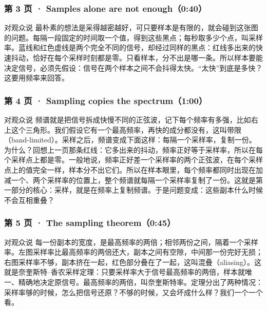 \subsubsection*{第 3 页 · Samples alone are not enough（0:40）}
\begin{exampleblock}{对观众说}
最朴素的想法是采得越密越好，可只要样本是有限的，就会碰到这张图的问题。每隔一段固定的时间取一个值，得到这些黑点；每秒取多少个点，叫采样率。蓝线和红色虚线是两个完全不同的信号，却经过同样的黑点：红线多出来的快速抖动，恰好在每个采样时刻都是零。只看样本，分不出是哪一条。所以样本要能决定信号，必须先假设：信号在两个样本之间不会抖得太快。“太快”到底是多快？这要用频率来回答。
\end{exampleblock}

\subsubsection*{第 4 页 · Sampling copies the spectrum（1:00）}
\begin{exampleblock}{对观众说}
频谱就是把信号拆成快慢不同的正弦波，记下每个频率有多强，比如右上这个三角形。我们假设它有一个最高频率，再快的成分都没有，这叫带限（band-limited）。采样之后，频谱变成下面这样：每隔一个采样率，复制一份。为什么？回想上一页那条红线：它多出来的抖动，频率正好等于采样率，所以在每个采样点上都是零。一般地说，频率正好差一个采样率的两个正弦波，在每个采样点上的值完全一样，样本分不出它们。所以在样本眼里，每个频率都同时出现在加减一个、两个采样率的位置上，整个频谱就每隔一个采样率复制了一份。这就是第一部分的核心：采样，就是在频率上复制频谱。于是问题变成：这些副本什么时候不会互相重叠？
\end{exampleblock}

\subsubsection*{第 5 页 · The sampling theorem（0:45）}
\begin{exampleblock}{对观众说}
每一份副本的宽度，是最高频率的两倍；相邻两份之间，隔着一个采样率。左图采样率比最高频率的两倍还大，副本之间有空隙，中间那一份完好无损；右图采样率不够，副本挤在一起，红色部分叠在了一起，这叫混叠（aliasing）。这就是奈奎斯特--香农采样定理：只要采样率大于信号最高频率的两倍，样本就唯一、精确地决定原信号。最高频率的两倍，叫奈奎斯特率。定理分出了两种情况：采样率够的时候，怎么把信号还原？不够的时候，又会坏成什么样？我们一个一个看。
\end{exampleblock}

